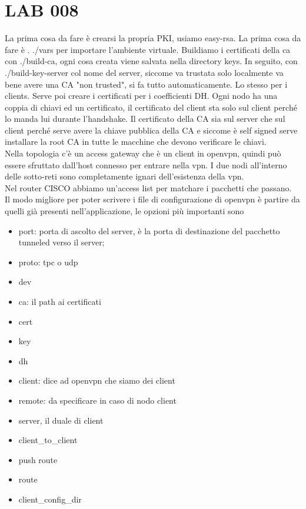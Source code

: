\documentclass[12pt, oneside]{extbook} %
\begin{document}
\section*{LAB 008}
La prima cosa da fare è crearsi la propria PKI, usiamo easy-rsa. La prima cosa da fare è . ./vars per importare l'ambiente virtuale. Buildiamo i certificati della ca con ./build-ca, ogni cosa creata viene salvata nella directory keys. In seguito, con ./build-key-server col nome del server, siccome va trustata solo localmente va bene avere una CA "non trusted", si fa tutto automaticamente. Lo stesso per i clients. Serve poi creare i certificati per i coefficienti DH. Ogni nodo ha una coppia di chiavi ed un certificato, il certificato del client sta solo sul client perché lo manda lui durante l'handshake. Il certificato della CA sia sul server che sul client perché serve avere la chiave pubblica della CA e siccome è self signed serve installare la root CA in tutte le macchine che devono verificare le chiavi.\\Nella topologia c'è un access gateway che è un client in openvpn, quindi può essere sfruttato dall'host connesso per entrare nella vpn. I due nodi all'interno delle sotto-reti sono completamente ignari dell'esistenza della vpn.\\Nel router CISCO abbiamo un'access list per matchare i pacchetti che passano.\\Il modo migliore per poter scrivere i file di configurazione di openvpn è partire da quelli già presenti nell'applicazione, le opzioni più importanti sono
\begin{itemize}
\item port: porta di ascolto del server, è la porta di destinazione del pacchetto tunneled verso il server;
\item proto: tpc o udp
\item dev
\item ca: il path ai certificati
\item cert
\item key
\item dh
\item client: dice ad openvpn che siamo dei client 
\item remote: da specificare in caso di nodo client
\item server, il duale di client
\item client\_to\_client
\item push route
\item route
\item client\_config\_dir
\end{itemize}
\end{document}
